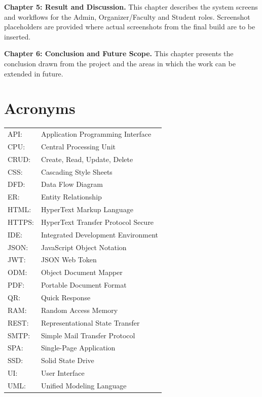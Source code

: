 \documentclass[12pt,a4paper]{report}
\begin{document}
\textbf{Chapter 5: Result and Discussion.} This chapter describes the system screens and workflows for the Admin, Organizer/Faculty and Student roles. Screenshot placeholders are provided where actual screenshots from the final build are to be inserted.

\textbf{Chapter 6: Conclusion and Future Scope.} This chapter presents the conclusion drawn from the project and the areas in which the work can be extended in future.
\newpage

\renewcommand{\contentsname}{List of Contents}
\tableofcontents
\newpage
\listoffigures
\newpage
\listoftables
\newpage

\chapter*{Acronyms}
\begin{tabular}{@{}ll}
API: & Application Programming Interface\\
CPU: & Central Processing Unit\\
CRUD: & Create, Read, Update, Delete\\
CSS: & Cascading Style Sheets\\
DFD: & Data Flow Diagram\\
ER: & Entity Relationship\\
HTML: & HyperText Markup Language\\
HTTPS: & HyperText Transfer Protocol Secure\\
IDE: & Integrated Development Environment\\
JSON: & JavaScript Object Notation\\
JWT: & JSON Web Token\\
ODM: & Object Document Mapper\\
PDF: & Portable Document Format\\
QR: & Quick Response\\
RAM: & Random Access Memory\\
REST: & Representational State Transfer\\
SMTP: & Simple Mail Transfer Protocol\\
SPA: & Single-Page Application\\
SSD: & Solid State Drive\\
UI: & User Interface\\
UML: & Unified Modeling Language\\
\end{tabular}
\newpage
\end{document}
